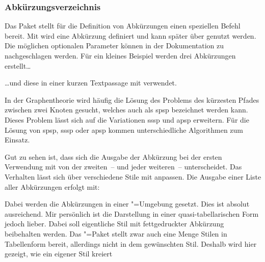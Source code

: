 \documentclass[english,ngerman]{tudscrartcl}
\begin{document}
\subsubsection{Abkürzungsverzeichnis}
Das Paket  stellt für die Definition von Abkürzungen einen 
speziellen Befehl bereit. Mit\LParameter{}%
 wird eine Abkürzung definiert und 
kann später über  genutzt werden. Die möglichen optionalen 
Parameter können in der Dokumentation zu  nachgeschlagen 
werden. Für ein kleines Beispiel werden drei Abkürzungen erstellt\dots
%
\begin{Tutorial}
\end{Tutorial}
%
\dots und diese in einer kurzen Textpassage mit  
verwendet.
%
\begin{Tutorial}
In der Graphentheorie wird häufig die Lösung des Problems des kürzesten
Pfades zwischen zwei Knoten gesucht, welches auch als \gls{spsp}
bezeichnet werden kann. Dieses Problem lässt sich auf die Variationen
\gls{sssp} und \gls{apsp} erweitern. Für die Lösung von \gls{spsp},
\gls{sssp} oder \gls{apsp} kommen unterschiedliche Algorithmen zum Einsatz.
\end{Tutorial}
%
Gut zu sehen ist, dass sich die Ausgabe der Abkürzung bei der ersten Verwendung 
mit  von der zweiten~-- und jeder weiteren~-- unterscheidet. Das 
Verhalten lässt sich über verschiedene Stile mit  
anpassen. Die Ausgabe einer Liste aller Abkürzungen erfolgt mit:
%
\begin{Tutorial*}
\printacronyms
\end{Tutorial*}
\begin{quoting}[rightmargin=0pt]
\vspace*{-\baselineskip}
\glsdisablehyper
\printacronyms
\end{quoting}
%
Dabei werden die Abkürzungen in einer "=Umgebung 
gesetzt. Dies ist absolut ausreichend. Mir persönlich ist die Darstellung in 
einer quasi-tabellarischen Form jedoch lieber. Dabei soll eigentliche Stil mit 
fettgedruckter Abkürzung beibehalten werden. Das "=Paket 
stellt zwar auch eine Menge Stilen in Tabellenform bereit, allerdings nicht in 
dem gewünschten Stil. Deshalb wird hier gezeigt, wie ein eigener Stil kreiert 
\end{document}
